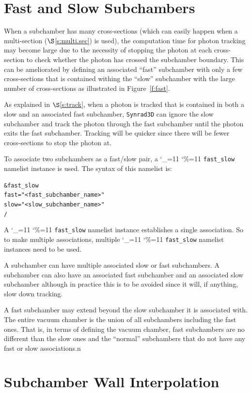 \documentclass[11pt,openany]{report}
\newcommand{\sref}[1]{$\S$\ref{#1}}
\newcommand{\srthree}{\texttt{Synrad3D}\xspace}
\newcommand\ttcmd{\begingroup\catcode`\_=11 \catcode`\%=11 \dottcmd}
\newcommand\dottcmd[1]{\texttt{#1}\endgroup}
\newcommand{\fig}[1]{Figure~\ref{#1}}
\newcommand{\vn}{\ttcmd}
\newlength{\ExBeg}
\newlength{\ExEnd}
\newenvironment{example}
  {\vspace{\ExBeg} \begin{alltt}}
  {\end{alltt} \vspace{\ExEnd}}
\begin{document}
\section{Fast and Slow Subchambers}
\label{s:fast}

When a subchamber has many cross-sections (which can easily happen when a multi-section
(\sref{s:multi.sec}) is used), the computation time for photon tracking may become large
due to the necessity of stopping the photon at each cross-section to check whether the
photon has crossed the subchamber boundary. This can be ameliorated by defining an
associated ``fast'' subchamber with only a few cross-sections that is contained withing
the ``slow'' subchamber with the large number of cross-sections as illustrated in
\fig{f:fast}.

As explained in \sref{s:track}, when a photon is tracked that is contained in both a slow
and an associated fast subchamber, \srthree can ignore the slow subchamber and track the
photon through the fast subchamber until the photon exits the fast subchamber. Tracking
will be quicker since there will be fewer cross-sections to stop the photon at.

To associate two subchambers as a fast/slow pair, a \vn{fast_slow} namelist instance is used.
The syntax of this namelist is:
\begin{example}
  &fast_slow
    fast = "<fast_subchamber_name>"
    slow = "<slow_subchamber_name>"
  /
\end{example}
A \vn{fast_slow} namelist instance establishes a single association. So to make multiple
associations, multiple \vn{fast_slow} namelist instances need to be used.

A subchamber can have multiple associated slow or fast subchambers. A subchamber can also
have an associated fast subchamber and an associated slow subchamber although in practice
this is to be avoided since it will, if anything, slow down tracking.

A fast subchamber may extend beyond the slow subchamber it is associated with. The entire
vacuum chamber is the union of all subchambers including the fast ones. That is, in terms
of defining the vacuum chamber, fast subchambers are no different than the slow ones and
the ``normal'' subchambers that do not have any fast or slow associations.n

\section{Subchamber Wall Interpolation} 
\label{s:wall}
\end{document}
